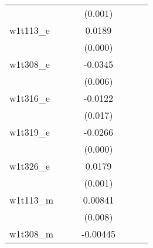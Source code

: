 {\begin{tabular}{l*{6}{c}}
            &                     &                     &     (0.001)         &                     &                     &                     \\
[1em]
w1t113\_e    &                     &                     &      0.0189\sym{***}&                     &                     &                     \\
            &                     &                     &     (0.000)         &                     &                     &                     \\
[1em]
w1t308\_e    &                     &                     &     -0.0345\sym{***}&                     &                     &                     \\
            &                     &                     &     (0.006)         &                     &                     &                     \\
[1em]
w1t316\_e    &                     &                     &     -0.0122\sym{**} &                     &                     &                     \\
            &                     &                     &     (0.017)         &                     &                     &                     \\
[1em]
w1t319\_e    &                     &                     &     -0.0266\sym{***}&                     &                     &                     \\
            &                     &                     &     (0.000)         &                     &                     &                     \\
[1em]
w1t326\_e    &                     &                     &      0.0179\sym{***}&                     &                     &                     \\
            &                     &                     &     (0.001)         &                     &                     &                     \\
[1em]
w1t113\_m    &                     &                     &     0.00841\sym{***}&                     &                     &                     \\
            &                     &                     &     (0.008)         &                     &                     &                     \\
[1em]
w1t308\_m    &                     &                     &    -0.00445         &                     &                     &                     \\

\end{tabular}}

